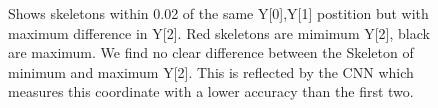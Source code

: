 \documentclass[11pt]{article} %
\begin{document}
\begin{figure}
\centering
{}%
\qquad
{}%
\caption{Shows skeletons within 0.02 of the same Y[0],Y[1] postition but with maximum difference in Y[2]. Red skeletons are mimimum Y[2], black are maximum. We find no clear difference between the Skeleton of minimum and maximum Y[2]. This is reflected by the CNN which measures this coordinate with a lower accuracy than the first two.}
\label{fig:skelsZcomp}
\end{figure}
\end{document}
